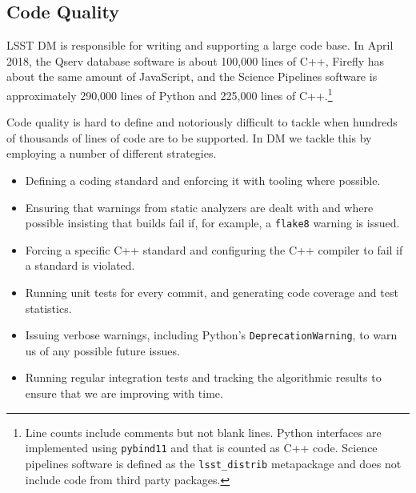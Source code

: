 \subsection{Code Quality}

LSST DM is responsible for writing and supporting a large code base.
In April 2018, the Qserv database software\cite{2011Wang:2011:QDS:2063348.2063364} is about 100,000 lines of C++, Firefly has about the same amount of JavaScript\cite{2016SPIE.9913E..0YR}, and the Science Pipelines software\cite{2018PASJ...70S...5B} is approximately 290,000 lines of Python and 225,000 lines of C++.\footnote{Line counts include comments but not blank lines. Python interfaces are implemented using \texttt{pybind11} and that is counted as C++ code. Science pipelines software is defined as the \texttt{lsst\_distrib} metapackage and does not include code from third party packages.}

%

Code quality is hard to define and notoriously difficult to tackle when hundreds of thousands of lines of code are to be supported.
In DM we tackle this by employing a number of different strategies.

\begin{itemize}
  \item Defining a coding standard\cite{devguide} and enforcing it with tooling where possible.
  \item Ensuring that warnings from static analyzers are dealt with and where possible insisting that builds fail if, for example, a \texttt{flake8} warning is issued.
  \item Forcing a specific C++ standard and configuring the C++ compiler to fail if a standard is violated.
  \item Running unit tests for every commit, and generating code coverage and test statistics.
  \item Issuing verbose warnings, including Python's \texttt{DeprecationWarning}, to warn us of any possible future issues.
  \item Running regular integration tests and tracking the algorithmic results to ensure that we are improving with time.
\end{itemize}

